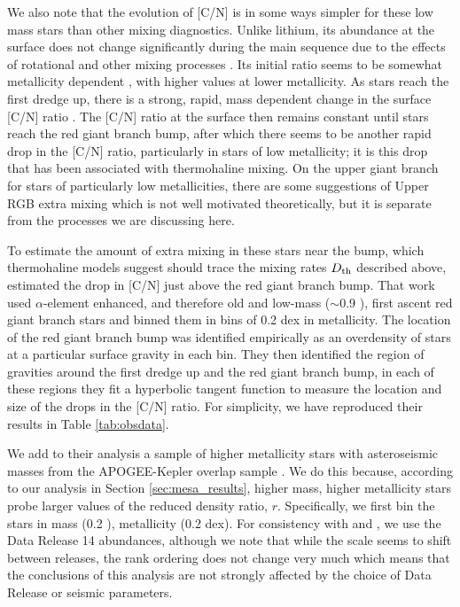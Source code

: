 We also note that the evolution of [C/N] is in some ways simpler for these low mass stars than other mixing diagnostics. Unlike lithium, its abundance at the surface does not change significantly during the main sequence due to the effects of rotational and other mixing processes \citep{Iben1967}. Its initial ratio seems to be somewhat metallicity dependent \citep{Shetrone2019}%
, with higher values at lower metallicity. As stars reach the first dredge up, there is a strong, rapid, mass dependent change in the surface [C/N] ratio \citep{MasseronGilmore2015, Martig2016, Ness2016, Spoo2022}. The [C/N] ratio at the surface then remains constant until stars reach the red giant branch bump, after which there seems to be another rapid drop in the [C/N] ratio, particularly in stars of low metallicity; it is this drop that has been associated with thermohaline mixing. On the upper giant branch for stars of particularly low metallicities, there are some suggestions of Upper RGB extra mixing \citep{Shetrone2019} which is not well motivated theoretically, but it is separate from the processes we are discussing here.

To estimate the amount of extra mixing in these stars near the bump, which thermohaline models suggest should trace the %
mixing rates $D_\mathrm{th}$ described above, %
\citet{Shetrone2019} estimated the drop in [C/N] just above the red giant branch bump. That work used $\alpha$-element enhanced, and therefore old and low-mass ($\sim$0.9 \msun), first ascent red giant branch stars and binned them in bins of 0.2 dex in metallicity. The location of the red giant branch bump was identified empirically as an overdensity of stars at a particular surface gravity in each bin. They then identified the region of gravities around the first dredge up and the red giant branch bump, in each of these regions they fit a hyperbolic tangent function to measure the location and size of the drops in the [C/N] ratio. For simplicity, we have reproduced their results in Table \ref{tab:obsdata}. 

We add to their analysis a sample of higher metallicity stars with asteroseismic masses from the APOGEE-Kepler overlap sample \citep[APOKASC,][]{Pinsonneault2014, Pinsonneault2018}. We do this because, according to our analysis in Section \ref{sec:mesa_results}, higher mass, higher metallicity stars probe larger values of the reduced density ratio, $r$. Specifically, we first bin the stars in mass (0.2 \msun), metallicity (0.2 dex). For consistency with \citet{Pinsonneault2018} and \citet{Shetrone2019}, we use the Data Release 14 \citet{DR14} abundances, although we note that while the scale seems to shift between releases, the rank ordering does not change very much \citep{Spoo2022} which means that the conclusions of this analysis are not strongly affected by the choice of Data Release or seismic parameters.

